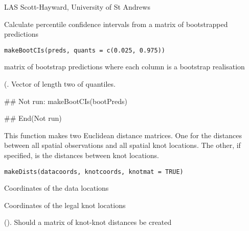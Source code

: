 \documentclass[a4paper]{book}
\begin{document}
%
\begin{Author}\relax
LAS Scott-Hayward, University of St Andrews
\end{Author}
%
\begin{Description}\relax
Calculate percentile confidence intervals from a matrix of bootstrapped predictions
\end{Description}
%
\begin{Usage}
\begin{verbatim}
makeBootCIs(preds, quants = c(0.025, 0.975))
\end{verbatim}
\end{Usage}
%
\begin{Arguments}
\begin{ldescription}
\item[\code{preds}] matrix of bootstrap predictions where each column is a bootstrap realisation

\item[\code{quants}] (. Vector of length two of quantiles.
\end{ldescription}
\end{Arguments}
%
\begin{Examples}
\begin{ExampleCode}
## Not run: 
makeBootCIs(bootPreds)

## End(Not run)
\end{ExampleCode}
\end{Examples}
%
\begin{Description}\relax
This function makes two Euclidean distance matrices.  One for the distances between all spatial observations and all spatial knot locations.  The other, if specified, is the distances between knot locations.
\end{Description}
%
\begin{Usage}
\begin{verbatim}
makeDists(datacoords, knotcoords, knotmat = TRUE)
\end{verbatim}
\end{Usage}
%
\begin{Arguments}
\begin{ldescription}
\item[\code{datacoords}] Coordinates of the data locations

\item[\code{knotcoords}] Coordinates of the legal knot locations

\item[\code{knotmat}] (). Should a matrix of knot-knot distances be created
\end{ldescription}
\end{Arguments}
\end{document}
